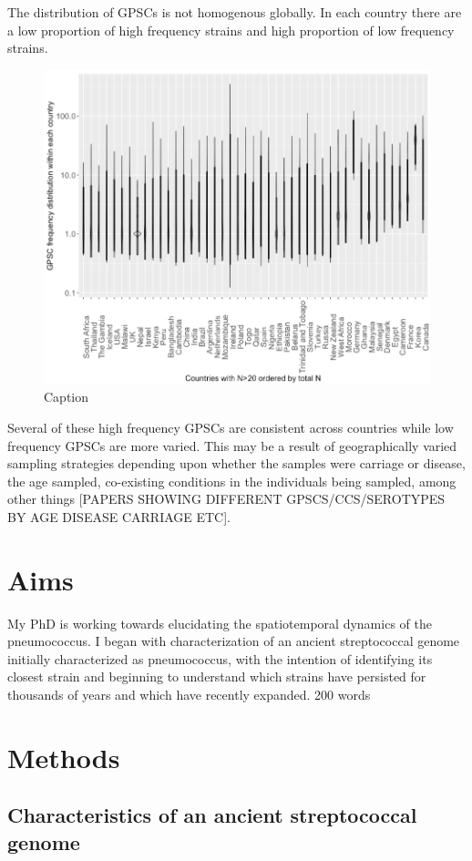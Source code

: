 \documentclass{article}
\begin{document}
The distribution of  GPSCs is not homogenous globally. In each country there are a low proportion of high frequency strains and high proportion of low frequency strains. \begin{figure}
    \centering
    \includegraphics[width=\textwidth]{08MAR21_gpscfreqDistribution.png}
    \caption{Caption}
    \label{fig:gpscfreqdist}
\end{figure} 
Several of these high frequency GPSCs are consistent across countries while low frequency GPSCs are more varied. This may be a result of geographically varied sampling strategies depending upon whether the samples were carriage or disease, the age sampled, co-existing conditions in the individuals being sampled, among other things [PAPERS SHOWING DIFFERENT GPSCS/CCS/SEROTYPES BY AGE DISEASE CARRIAGE ETC].  
\section{Aims}
My PhD is working towards elucidating the spatiotemporal dynamics of the pneumococcus. I began with characterization of an ancient streptococcal genome initially characterized as pneumococcus, with the intention of identifying its closest strain and beginning to understand which strains have persisted for thousands of years and which have recently expanded. 
200 words
\section{Methods}
\subsection{Characteristics of an ancient streptococcal genome}
\end{document}
